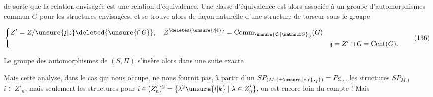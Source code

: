 
de sorte que la relation envisagée est une relation d'équivalence. Une classe d'équivalence  est alors associée à un groupe d'automorphismes commun $G$ pour les structures envisagées, et se trouve alors  de façon naturelle d'une structure de torseur sous le groupe

\[
 \left\{\begin{aligned}
 Z'&=Z/\unsure{\mathfrak z|z}\deleted{\unsure{\cap G}},\quad
 Z^{\deleted{\unsure{\prime|4}}}=\operatorname{Comm}_{\unsure{\mathfrak S|\mathscr S}_S}(G)\\
 &&\mathfrak z=Z'\cap G=\operatorname{Cent}(G).
 \end{aligned}\right.
 \tag*{(136)}
\]

Le groupe des automorphismes de $(S,\Pi)$   s'insère alors dans une suite exacte


Mais cette analyse, dans le cas qui nous occupe, ne nous fournit pas, à partir d'un $SP_{(M,\{\pm\unsure{e|\ell}_M\})}=P_{\Sigma_0}$,  \uline{les} structures $SP_{M,i}$ $i\in{Z'_n}$, mais seulement les structures pour $i\in(Z'_n)^2=\{\lambda^2\unsure{t|k}\mid \lambda\in Z'_n\}$, on est encore loin du compte ! Mais

